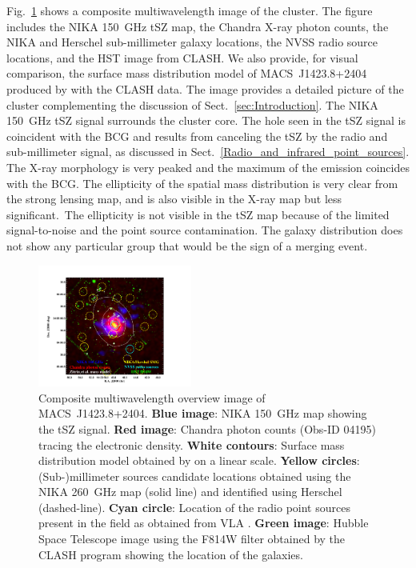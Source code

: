 \documentclass[traditabstract]{aa}
\begin{document}
Fig.~\ref{fig:MACSJ1424_mutiw} shows a composite multiwavelength image of the cluster. The figure includes the NIKA 150~GHz tSZ map, the Chandra X-ray photon counts, the NIKA and Herschel sub-millimeter galaxy locations, the NVSS radio source locations, and the HST image from CLASH. We also provide, for visual comparison, the surface mass distribution model of \mbox{MACS~J1423.8+2404} produced by \cite{zitrin2011,zitrin2015} with the CLASH data. The image provides a detailed picture of the cluster complementing the discussion of Sect.~\ref{sec:Introduction}. The NIKA 150~GHz  tSZ signal surrounds the cluster core. The hole seen in the tSZ signal is coincident with the BCG and results from  canceling  the tSZ by the radio and sub-millimeter signal, as discussed in Sect.~\ref{Radio_and_infrared_point_sources}. The X-ray morphology is very peaked and the maximum of the emission coincides with the BCG. The ellipticity of the spatial mass distribution is very clear from the strong lensing map, and is also visible in the X-ray map but less significant.\ The ellipticity is not visible in the tSZ map because of the limited signal-to-noise and the point source contamination. The galaxy distribution does not show any particular group that would be the sign of a merging event.
\begin{figure}
\centering
\includegraphics[trim=1cm 0cm 5cm 2cm, clip=true, width=0.45\textwidth]{Figure/MACSJ1424_multicolor.pdf}
\caption{\footnotesize Composite multiwavelength overview image of \mbox{MACS~J1423.8+2404}. {\bf Blue image}: NIKA 150~GHz map showing the tSZ signal. {\bf Red image}: Chandra photon counts (Obs-ID 04195) tracing the electronic density. {\bf White contours}: Surface mass distribution model obtained by \cite{zitrin2011,zitrin2015} on a linear scale. {\bf Yellow circles}: (Sub-)millimeter sources candidate locations obtained using the NIKA 260~GHz map (solid line) and identified using Herschel (dashed-line). {\bf Cyan circle}: Location of the radio point sources present in the field as obtained from VLA \citep{laroque2003}. {\bf Green image}: Hubble Space Telescope image using the F814W filter obtained by the CLASH  program \citep{postman2012} showing the location of the galaxies.}
\label{fig:MACSJ1424_mutiw}
\end{figure}
\end{document}
